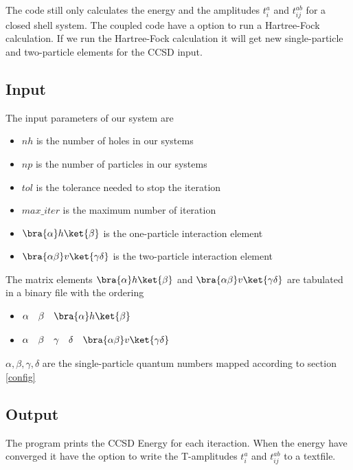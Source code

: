 The code still only calculates the energy and the amplitudes $t_i^a$ and $t_{ij}^{ab}$ for a closed shell system. The coupled code have a option to run a Hartree-Fock calculation. If we run the Hartree-Fock calculation it will get new single-particle and two-particle elements for the CCSD input.

\subsection{Input}
The input parameters of our system are

\begin{itemize}
  \item $nh$ is the number of holes in our systems
  \item $np$ is the number of particles in our systems
  \item $tol$ is the tolerance needed to stop the iteration
  \item $max\_iter$ is the maximum number of iteration
  \item $\bra{\alpha}h\ket{\beta}$ is the one-particle interaction element
  \item $\bra{\alpha\beta}v\ket{\gamma \delta}$ is the two-particle interaction element
\end{itemize}
%
The matrix elements $\bra{\alpha}h\ket{\beta}$ and $\bra{\alpha\beta}v\ket{\gamma \delta}$ are tabulated in a binary file with the ordering

\begin{itemize}
  \item $\begin{matrix}\alpha & \beta & \bra{\alpha}h\ket{\beta} \end{matrix}$       
  \item $\begin{matrix}\alpha & \beta & \gamma & \delta & \bra{\alpha\beta}v\ket{\gamma \delta} \end{matrix}$      
\end{itemize}
%
$\alpha,\beta,\gamma,\delta$ are the single-particle quantum numbers mapped according to section \ref{config}

\subsection{Output}
The program prints the CCSD Energy for each iteraction. When the energy have converged it have the option to write the T-amplitudes $t_i^a$ and $t_{ij}^{ab}$ to a textfile.

